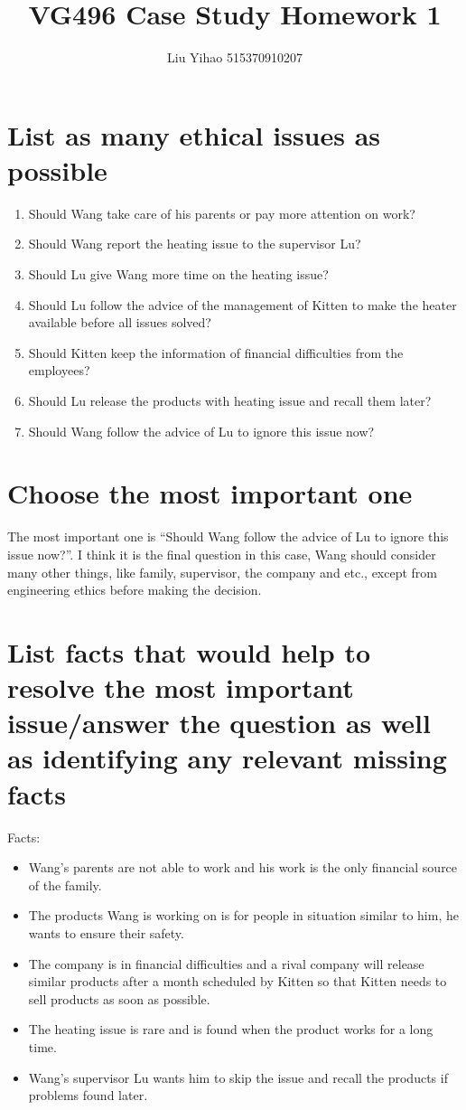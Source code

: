 \documentclass{article}
\title{VG496 Case Study Homework 1}
\author{Liu Yihao 515370910207}
\date{}
\begin{document}
\maketitle

\section{List as many ethical issues as possible}

\begin{enumerate}
\item Should Wang take care of his parents or pay more attention on work?
\item Should Wang report the heating issue to the supervisor Lu?
\item Should Lu give Wang more time on the heating issue?
\item Should Lu follow the advice of the management of Kitten to make the heater available before all issues solved?
\item Should Kitten keep the information of financial difficulties from the employees?
\item Should Lu release the products with heating issue and recall them later?
\item Should Wang follow the advice of Lu to ignore this issue now?
\end{enumerate}

\section{Choose the most important one}

The most important one is ``Should Wang follow the advice of Lu to ignore this issue now?''. I think it is the final question in this case, Wang should consider many other things, like family, supervisor, the company and etc., except from engineering ethics before making the decision.

\section{List facts that would help to resolve the most important issue/answer the question as well as identifying any relevant missing facts}

Facts:

\begin{itemize}
\item Wang's parents are not able to work and his work is the only financial source of the family.
\item The products Wang is working on is for people in situation similar to him, he wants to ensure their safety.
\item The company is in financial difficulties and a rival company will release similar products after a month scheduled by Kitten so that Kitten needs to sell products as soon as possible. 
\item The heating issue is rare and is found when the product works for a long time.
\item Wang's supervisor Lu wants him to skip the issue and recall the products if problems found later.
\end{itemize}
\end{document}
